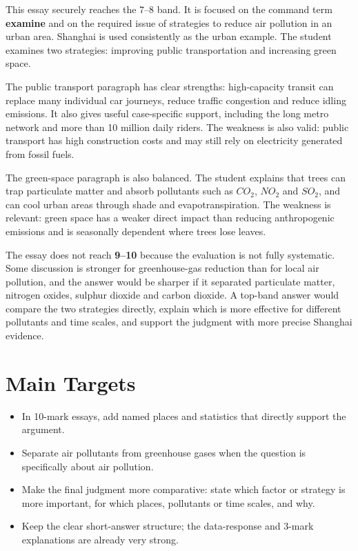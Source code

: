 \documentclass[11pt,a4paper]{article}
\newcommand{\term}[1]{\textcolor{HeadingBlue}{\textbf{#1}}}
\newcommand{\score}[1]{\textcolor{AccentTeal}{\textbf{#1}}}
\begin{document}
This essay securely reaches the 7--8 band. It is focused on the command term
\term{examine} and on the required issue of strategies to reduce air pollution
in an urban area. Shanghai is used consistently as the urban example. The
student examines two strategies: improving public transportation and increasing
green space.

The public transport paragraph has clear strengths: high-capacity transit can
replace many individual car journeys, reduce traffic congestion and reduce
idling emissions. It also gives useful case-specific support, including the
long metro network and more than 10 million daily riders. The weakness is also
valid: public transport has high construction costs and may still rely on
electricity generated from fossil fuels.

The green-space paragraph is also balanced. The student explains that trees can
trap particulate matter and absorb pollutants such as $CO_2$, $NO_2$ and
$SO_2$, and can cool urban areas through shade and evapotranspiration. The
weakness is relevant: green space has a weaker direct impact than reducing
anthropogenic emissions and is seasonally dependent where trees lose leaves.

The essay does not reach \score{9--10} because the evaluation is not fully
systematic. Some discussion is stronger for greenhouse-gas reduction than for
local air pollution, and the answer would be sharper if it separated
particulate matter, nitrogen oxides, sulphur dioxide and carbon dioxide. A
top-band answer would compare the two strategies directly, explain which is
more effective for different pollutants and time scales, and support the
judgment with more precise Shanghai evidence.

\section{Main Targets}

\begin{itemize}
  \item In 10-mark essays, add named places and statistics that directly
  support the argument.
  \item Separate air pollutants from greenhouse gases when the question is
  specifically about air pollution.
  \item Make the final judgment more comparative: state which factor or
  strategy is more important, for which places, pollutants or time scales, and
  why.
  \item Keep the clear short-answer structure; the data-response and 3-mark
  explanations are already very strong.
\end{itemize}
\end{document}
